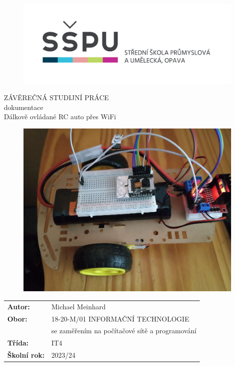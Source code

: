 \documentclass[12pt, a4paper,
oneside,      %
openany
]{report}
\title{\nazevPrace} %
\author{\jmenoAutora} %
\date{\datumOdevzdani} %
\newcommand\obor{INFORMAČNÍ TECHNOLOGIE} %
\newcommand\kodOboru{18-20-M/01} %
\newcommand\zamereni{se zaměřením na počítačové sítě a programování} %
\newcommand\trida{IT4} %
\newcommand\jmenoAutora{Michael Meinhard}  %
\newcommand\skolniRok{2023/24} %
\newcommand\nazevPrace{Dálkově ovládané RC auto přes WiFi} %
\begin{document}
    \pagestyle{empty}
	\clearpage

	
	{\selectfont
		\begin{figure}[h]
			\centering
			\includegraphics[width=0.6\linewidth]{image/logo-skoly.png} 
		\end{figure}
		
		
		{\bfseries %
			\begin{center}
				\vspace{0.025 \textheight}
				\LARGE{ZÁVĚREČNÁ STUDIJNÍ PRÁCE}\\
				\large{dokumentace}\\
				\vspace{0.075 \textheight}
				\LARGE {\nazevPrace}\\
			\end{center}  
		}%
		
		\begin{figure}[h]
			\centering
			\includegraphics[width=0.65\linewidth]{image/car.png} 
		\end{figure}
		
		\vspace{0.02 \textheight}
		\begin{table}[h!]
			\begin{tabular}{ll}
				\textbf{Autor:} & \jmenoAutora\\ 
				\textbf{Obor:} & \kodOboru { } \obor\\
				\textbf{} & \zamereni\\
				\textbf{Třída:} & \trida\\
				\textbf{Školní rok:} & \skolniRok\\
			\end{tabular}
			
		\end{table}		
	}	
\clearpage
	
\end{document}
